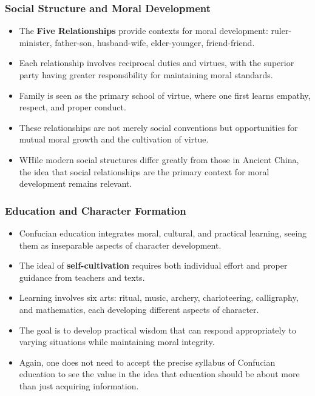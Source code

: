 \documentclass{beamer}
\begin{document}
\begin{frame}
    \frametitle{Social Structure and Moral Development}
    \begin{itemize}
        \item The \textbf{Five Relationships} provide contexts for moral development: ruler-minister, father-son, husband-wife, elder-younger, friend-friend.
        
        \item Each relationship involves reciprocal duties and virtues, with the superior party having greater responsibility for maintaining moral standards.
        
        \item Family is seen as the primary school of virtue, where one first learns empathy, respect, and proper conduct.
        
        \item These relationships are not merely social conventions but opportunities for mutual moral growth and the cultivation of virtue.
        
        \item WHile modern social structures differ greatly from those in Ancient China, the idea that social relationships are the primary context for moral development remains relevant.
    \end{itemize}
\end{frame}

\begin{frame}
    \frametitle{Education and Character Formation}
    \begin{itemize}
        \item Confucian education integrates moral, cultural, and practical learning, seeing them as inseparable aspects of character development.
        
        \item The ideal of \textbf{self-cultivation} requires both individual effort and proper guidance from teachers and texts.
        
        \item Learning involves six arts: ritual, music, archery, charioteering, calligraphy, and mathematics, each developing different aspects of character.
        
        \item The goal is to develop practical wisdom that can respond appropriately to varying situations while maintaining moral integrity.
        
        \item Again, one does not need to accept the precise syllabus of Confucian education to see the value in the idea that education should be about more than just acquiring information.
    \end{itemize}
\end{frame}
\end{document}
